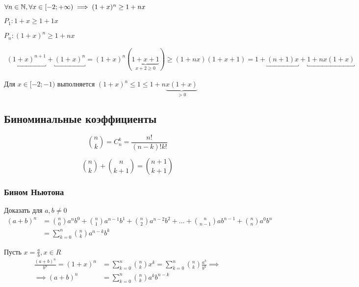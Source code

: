 \begin{problem}
	\( \forall n \in \mathbb{N}, \forall x \in [-2; +\infty) \implies (1 + x)^n \geq 1 + nx \)
\end{problem}

\( P_1 : 1 + x \geq 1 + 1 x \)

\( P_{n} : (1 + x)^{n} \geq 1 + nx \)

\begin{align*}
	\underbracket{(1 + x)^{n + 1}} + \underbracket{(1 + x)^n}
	= (1 + x)^n(\underbrace{1 + x + 1}_{x + 2 \geq 0}) 
	\geq (1 + nx) (1 + x + 1)
	= 
	\underbracket{1 + (n + 1)x} + \underbracket{1 + nx(1 + x)}
\end{align*}

Для \( x \in [-2; -1) \) выполняется \( (1 + x)^n \leq 1 \leq 1 + n\underbrace{x(1 + x)}_{> 0} \)

\subsection{Биноминальные коэффициенты}

\[
	\binom{n}{k} = C_n^k = \frac{n!}{(n - k)! k!}
\]

\[
	\binom{n}{k} + \binom{n}{k + 1} = \binom{n + 1}{k + 1}
\]


\subsubsection{Бином Ньютона}

\begin{problem} 
	Доказать для \( a, b \neq 0 \)
	\begin{align*}
		(a + b)^n 
		&= \binom{n}{0}a^n b^0 + \binom{n}{1} a^{n - 1} b^1 + \binom{n}{2} a^{n - 2} b^2 + \dots 
			+  \binom{n}{n - 1} a b^{n-1} + \binom{n}{n} a^0 b^n \\
		&= \sum^n_{k=0} \binom{n}{k} a^{n - k} b^k
	\end{align*}
\end{problem}

Пусть \( x = \frac{a}{b}, x \in R \)
\begin{align*}
	\frac{(a + b)^n}{b^n} = (1 + x)^n &= \sum^n_{k = 0} \binom{n}{k} x^k 
	= \sum_{k = 0}^n \binom{n}{k} \frac{a^k}{b^k} \implies \\
	\implies (a + b)^n &= \sum_{k=0}^n \binom{n}{k} a^k b^{n - k}
\end{align*}


